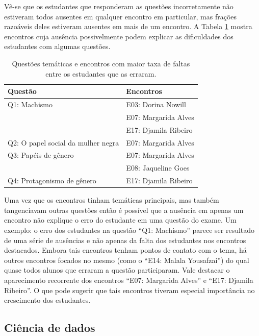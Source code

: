 \documentclass[
]{book}
\begin{document}
Vê-se que os estudantes que responderam as questões incorretamente não estiveram todos ausentes em qualquer encontro em particular, mas frações razoáveis deles estiveram ausentes em mais de um encontro. A Tabela \ref{tab:quadroimpacto1} mostra encontros cuja ausência possivelmente podem explicar as dificuldades dos estudantes com algumas questões.

\begin{table}

\caption{\label{tab:quadroimpacto1}Questões temáticas e encontros com maior taxa de faltas entre os estudantes que as erraram.}
\centering
\begin{tabular}[t]{l|l}
\hline
Questão & Encontros\\
\hline
Q1: Machismo & E03: Dorina Nowill\\
\hline
 & E07: Margarida Alves\\
\hline
 & E17: Djamila Ribeiro\\
\hline
Q2: O papel social da mulher negra & E07: Margarida Alves\\
\hline
Q3: Papéis de gênero & E07: Margarida Alves\\
\hline
 & E08: Jaqueline Goes\\
\hline
Q4: Protagonismo de gênero & E17: Djamila Ribeiro\\
\hline
\end{tabular}
\end{table}

Uma vez que os encontros tinham temáticas principais, mas também tangenciavam outras questões então é possível que a ausência em apenas um encontro não explique o erro do estudante em uma questão do exame. Um exemplo: o erro dos estudantes na questão ``Q1: Machismo'' parece ser resultado de uma série de ausências e não apenas da falta dos estudantes nos encontros destacados. Embora tais encontros tenham pontos de contato com o tema, há outros encontros focados no mesmo (como o ``E14: Malala Yousafzai'') do qual quase todos alunos que erraram a questão participaram. Vale destacar o aparecimento recorrente dos encontros ``E07: Margarida Alves'' e ``E17: Djamila Ribeiro''. O que pode sugerir que tais encontros tiveram especial importância no crescimento dos estudantes.

\hypertarget{ciuxeancia-de-dados}{%
\subsection{Ciência de dados}\label{ciuxeancia-de-dados}}
\end{document}
